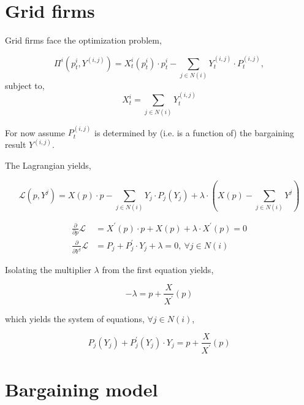 \documentclass[american]{scrartcl}
\begin{document}
\section{Grid firms}

Grid firms face the optimization problem,

\begin{equation}
	\Pi^i\left(p^i_t, Y^{(i, j)}\right) = X^i_{t}(p^i_t) \cdot p^i_t - \sum_{j \in N(i)} Y^{(i, j)}_{t} \cdot P^{(i, j)}_t,
\end{equation}
subject to,
\begin{equation}
	X^i_t=  \sum_{j \in N(i)} Y^{(i, j)}_{t}
\end{equation}

For now assume $P_t^{(i, j)}$ is determined by (i.e. is a function of) the bargaining result $Y^{(i, j)}$.

The Lagrangian yields,

\begin{equation}
	\mathcal{L}\left(p, Y^j\right) = X(p) \cdot p - \sum_{j \in N(i)} Y_j \cdot P_j (Y_j) + \lambda\cdot \left(X(p) - \sum_{j \in N(i)} Y^j\right)
\end{equation}


\begin{equation}
	\begin{split}
		\frac{\partial}{\partial p} \mathcal{L} &= X^\prime(p) \cdot p + X(p) + \lambda \cdot X^\prime(p) = 0 \\
		\frac{\partial}{\partial Y^j} \mathcal{L} &= P_j + P^\prime_j \cdot Y_j + \lambda =0, \ \forall j \in N(i)
	\end{split}
\end{equation}

Isolating the multiplier $\lambda$ from the first equation yields,

\begin{equation}
	- \lambda = p + \frac{X}{X^\prime}(p)
\end{equation}

which yields the system of equations, $\forall j \in N(i)$,

\begin{equation}
	P_j(Y_j) + P^\prime_j(Y_j) \cdot Y_j = p + \frac{X}{X^\prime}(p)
\end{equation}

\newpage
\section{Bargaining model}
\end{document}
